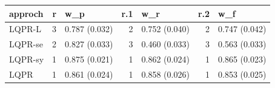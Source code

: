 \begin{tabular}{lrlrlrl}
\hline
 approch   &   r & w\_p           &   r.1 & w\_r           &   r.2 & w\_f           \\
\hline
 LQPR-L    &   3 & 0.787 (0.032) &     2 & 0.752 (0.040) &     2 & 0.747 (0.042) \\
 LQPR-se   &   2 & 0.827 (0.033) &     3 & 0.460 (0.033) &     3 & 0.563 (0.033) \\
 LQPR-sy   &   1 & 0.875 (0.021) &     1 & 0.862 (0.024) &     1 & 0.865 (0.023) \\
 LQPR      &   1 & 0.861 (0.024) &     1 & 0.858 (0.026) &     1 & 0.853 (0.025) \\
\hline
\end{tabular}